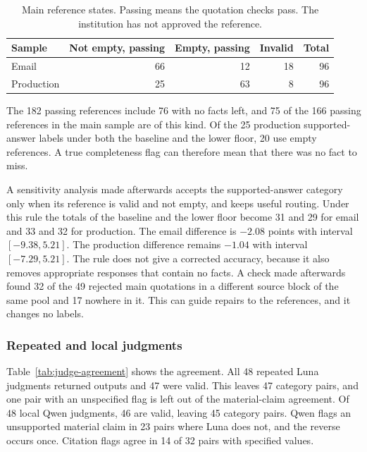 \begin{table}[htbp]
\centering
\caption[Main reference states]{Main reference states. Passing means the quotation checks pass. The institution has not approved the reference.}
\label{tab:reference-states}
\begin{tabular}{lrrrr}
\toprule
Sample & Not empty, passing & Empty, passing & Invalid & Total \\
\midrule
Email & 66 & 12 & 18 & 96 \\
Production & 25 & 63 & 8 & 96 \\
\bottomrule
\end{tabular}
\end{table}

The 182 passing references include 76 with no facts left, and 75 of the 166 passing references in the main sample are of this kind. Of the 25 production supported-answer labels under both the baseline and the lower floor, 20 use empty references. A true completeness flag can therefore mean that there was no fact to miss.

A sensitivity analysis made afterwards accepts the supported-answer category only when its reference is valid and not empty, and keeps useful routing. Under this rule the totals of the baseline and the lower floor become 31 and 29 for email and 33 and 32 for production. The email difference is $-2.08$ points with interval $[-9.38,5.21]$. The production difference remains $-1.04$ with interval $[-7.29,5.21]$. The rule does not give a corrected accuracy, because it also removes appropriate responses that contain no facts. A check made afterwards found 32 of the 49 rejected main quotations in a different source block of the same pool and 17 nowhere in it. This can guide repairs to the references, and it changes no labels.

\subsubsection{Repeated and local judgments}
\label{sec:judge-consistency}

Table~\ref{tab:judge-agreement} shows the agreement. All 48 repeated Luna judgments returned outputs and 47 were valid. This leaves 47 category pairs, and one pair with an unspecified flag is left out of the material-claim agreement. Of 48 local Qwen judgments, 46 are valid, leaving 45 category pairs. Qwen flags an unsupported material claim in 23 pairs where Luna does not, and the reverse occurs once. Citation flags agree in 14 of 32 pairs with specified values.

